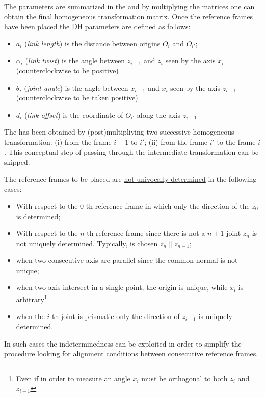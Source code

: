 The parameters are summarized in the  and by multiplying the matrices one can obtain the final homogeneous transformation matrix. Once the reference frames have been placed the DH parameters are defined as follows:
\begin{itemize}
    \itemsep-0.3em
    \item $a_i$ (\textit{link length}) is the distance between origins $O_i$ and $O_{i'}$; 
    \item $\alpha_i$ (\textit{link twist}) is the angle between $z_{i-1}$ and $z_{i}$ seen by the axis $x_i$ (counterclockwise to be positive)
    \item $\theta_i$ (\textit{joint angle}) is the angle between $x_{i-1}$ and $x_{i}$ seen by the axis $z_{i-1}$ (counterclockwise to be taken positive)
    \item $d_i$ (\textit{link offset}) is the coordinate of $O_{i'}$ along the axis $z_{i-1}$
\end{itemize}

\begin{remark}
    The  has been obtained by (post)multipliying two successive homogeneous transformation: (i) from the frame $i-1$ to $i'$; (ii) from the frame $i'$ to the frame $i$. This conceptual step of passing through the intermediate transformation can be skipped.
\end{remark}

\begin{remark}
    The reference frames to be placed are \underline{not univocally determined} in the following cases:
    \begin{itemize}
        \itemsep-0.3em
        \item With respect to the 0-th reference frame in which only the direction of the $z_0$ is determined; 
        \item With respect to the $n$-th reference frame since there is not a $n+1$ joint $z_n$ is not uniquely determined. Typically, is chosen $z_{n}\parallel z_{n-1}$; 
        \item when two consecutive axis are parallel since the common normal is not unique; 
        \item when two axis intersect in a single point, the origin is unique, while $x_i$ is arbitrary\footnote{
            Even if in order to measure an angle $x_i$ must be orthogonal to both $z_i$ and $z_{i-1}$
        }
        \item when the $i$-th joint is prismatic only the direction of $z_{i-1}$ is uniquely determined.
    \end{itemize}
    In such cases the indeterminedness can be exploited in order to simplify the procedure looking for alignment conditions between consecutive reference frames.
\end{remark}

